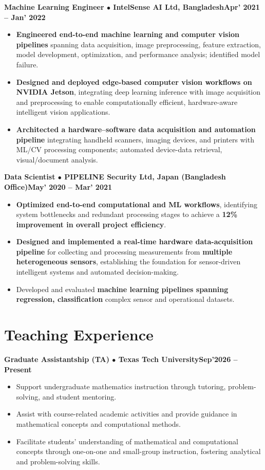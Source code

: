 \documentclass[10pt,letterpaper]{article}
\newcommand{\entry}[2]{\vspace{2pt}\par\noindent\textbf{#1}\hfill\textbf{#2}\par\nopagebreak}
\begin{document}
\entry{Machine Learning Engineer $\bullet$ IntelSense AI Ltd, Bangladesh}{Apr' 2021 -- Jan' 2022}
\begin{itemize}
  \item \textbf{Engineered end-to-end machine learning and computer vision pipelines} spanning data acquisition, image preprocessing, feature extraction, model development, optimization, and performance analysis; identified model failure.
  \item \textbf{Designed and deployed edge-based computer vision workflows on NVIDIA Jetson}, integrating deep learning inference with image acquisition and preprocessing to enable computationally efficient, hardware-aware intelligent vision applications.
  \item \textbf{Architected a hardware--software data acquisition and automation pipeline} integrating handheld scanners, imaging devices, and printers with ML/CV processing components; automated device-data retrieval, visual/document analysis.
\end{itemize}

\entry{Data Scientist $\bullet$ PIPELINE Security Ltd, Japan (Bangladesh Office)}{May' 2020 -- Mar' 2021}
\begin{itemize}
  \item \textbf{Optimized end-to-end computational and ML workflows}, identifying system bottlenecks and redundant processing stages to achieve a \textbf{12\% improvement in overall project efficiency}.
  \item \textbf{Designed and implemented a real-time hardware data-acquisition pipeline} for collecting and processing measurements from \textbf{multiple heterogeneous sensors}, establishing the foundation for sensor-driven intelligent systems and automated decision-making.
  \item Developed and evaluated \textbf{machine learning pipelines spanning regression, classification} complex sensor and operational datasets.
\end{itemize}

\section{Teaching Experience}

\entry{Graduate Assistantship (TA) $\bullet$ Texas Tech University}{Sep'2026 -- Present}
\begin{itemize}
  \item Support undergraduate mathematics instruction through tutoring, problem-solving, and student mentoring.
  \item Assist with course-related academic activities and provide guidance in mathematical concepts and computational methods.
  \item Facilitate students' understanding of mathematical and computational concepts through one-on-one and small-group instruction, fostering analytical and problem-solving skills.
\end{itemize}
\end{document}
